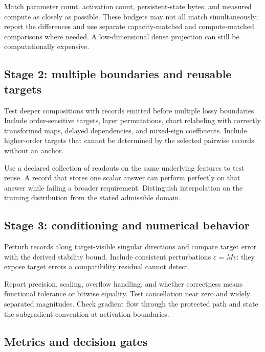 Match parameter count, activation count, persistent-state bytes, and measured
compute as closely as possible. These budgets may not all match simultaneously;
report the differences and use separate capacity-matched and compute-matched
comparisons where needed. A low-dimensional dense projection can still be
computationally expensive.

\subsection{Stage 2: multiple boundaries and reusable targets}

Test deeper compositions with records emitted before multiple lossy boundaries.
Include order-sensitive targets, layer permutations, chart relabeling with
correctly transformed maps, delayed dependencies, and mixed-sign coefficients.
Include higher-order targets that cannot be determined by the selected
pairwise records without an anchor.

Use a declared collection of readouts on the same underlying features to test
reuse. A record that stores one scalar answer can perform perfectly on that
answer while failing a broader requirement. Distinguish interpolation on
the training distribution from the stated admissible domain.

\subsection{Stage 3: conditioning and numerical behavior}

Perturb records along target-visible singular directions and compare target
error with the derived stability bound. Include consistent perturbations
\(\varepsilon=Mv\): they expose target errors a compatibility residual
cannot detect.

Report precision, scaling, overflow handling, and whether correctness means
functional tolerance or bitwise equality. Test cancellation near zero and
widely separated magnitudes. Check gradient flow through the protected path
and state the subgradient convention at activation boundaries.

\subsection{Metrics and decision gates}

